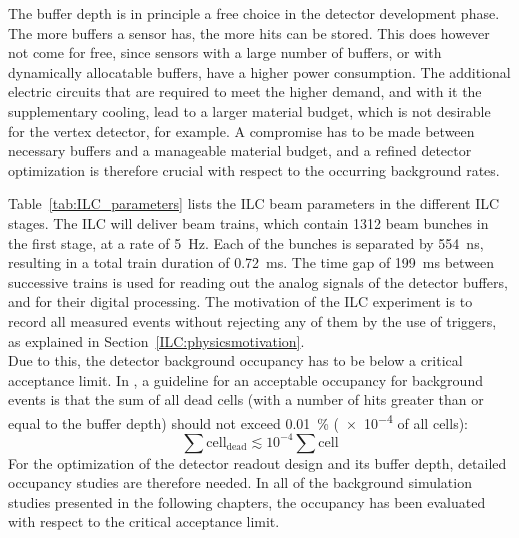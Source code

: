 The buffer depth is in principle a free choice in the detector development phase.
The more buffers a sensor has, the more hits can be stored.
This does however not come for free, since sensors with a large number of buffers, or with dynamically allocatable buffers, have a higher power consumption.
The additional electric circuits that are required to meet the higher demand, and with it the supplementary cooling, lead to a larger material budget, which is not desirable for the vertex detector, for example.
A compromise has to be made between necessary buffers and a manageable material budget, and a refined detector optimization is therefore crucial with respect to the occurring background rates.

Table~\ref{tab:ILC_parameters} lists the ILC beam parameters in the different ILC stages.
The ILC will deliver beam trains, which contain 1312 beam bunches in the first stage, at a rate of \SI{5}{\hertz}.
Each of the bunches is separated by \SI{554}{\nano\second}, resulting in a total train duration of \SI{0.72}{\milli\second}.
The time gap of \SI{199}{\milli\second} between successive trains is used for reading out the analog signals of the detector buffers, and for their digital processing.
The motivation of the ILC experiment is to record all measured events without rejecting any of them by the use of triggers, as explained in Section~\ref{ILC:physicsmotivation}.
\\Due to this, the detector background occupancy has to be below a critical acceptance limit.
In \sid, a guideline for an acceptable occupancy for background events is that the sum of all dead cells (with a number of hits greater than or equal to the buffer depth) should not exceed \SI{0.01}{\percent} (\num{e-4} of all cells):
\begin{equation}
 \sum \mathrm{cell}_{\mathrm{dead}} \lesssim 10^{-4} \sum \mathrm{cell}
\end{equation}
For the optimization of the detector readout design and its buffer depth, detailed occupancy studies are therefore needed.
In all of the background simulation studies presented in the following chapters, the \sid occupancy has been evaluated with respect to the critical acceptance limit.

